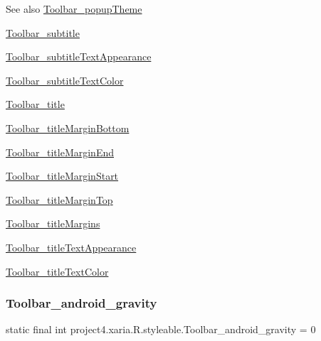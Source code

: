 \begin{DoxySeeAlso}{See also}
\hyperlink{classproject4_1_1xaria_1_1R_1_1styleable_ad04ed82b66818e311f872c158b0d6df5}{Toolbar\+\_\+popup\+Theme} 

\hyperlink{classproject4_1_1xaria_1_1R_1_1styleable_ab72a989ed660ee062ccf0405ae356a90}{Toolbar\+\_\+subtitle} 

\hyperlink{classproject4_1_1xaria_1_1R_1_1styleable_a4b938685d0218d8e307f8df758e2ca89}{Toolbar\+\_\+subtitle\+Text\+Appearance} 

\hyperlink{classproject4_1_1xaria_1_1R_1_1styleable_af2caead52c870ae8c1443c261585491e}{Toolbar\+\_\+subtitle\+Text\+Color} 

\hyperlink{classproject4_1_1xaria_1_1R_1_1styleable_abef8adccf5d6ad9f215787dab4631fcd}{Toolbar\+\_\+title} 

\hyperlink{classproject4_1_1xaria_1_1R_1_1styleable_a246fa138dbd3b691aa3595a8fb636a01}{Toolbar\+\_\+title\+Margin\+Bottom} 

\hyperlink{classproject4_1_1xaria_1_1R_1_1styleable_a5d2d546ae88e0aa378d02d8602e73b8a}{Toolbar\+\_\+title\+Margin\+End} 

\hyperlink{classproject4_1_1xaria_1_1R_1_1styleable_a96bcd70f7086d38b52652bee6e3f119a}{Toolbar\+\_\+title\+Margin\+Start} 

\hyperlink{classproject4_1_1xaria_1_1R_1_1styleable_aae9e96acb00fe36e1bac77812532a605}{Toolbar\+\_\+title\+Margin\+Top} 

\hyperlink{classproject4_1_1xaria_1_1R_1_1styleable_aad3d076117cb0923a57bf3c96cc0a6d5}{Toolbar\+\_\+title\+Margins} 

\hyperlink{classproject4_1_1xaria_1_1R_1_1styleable_ab0deb931fcb51a59a9c57d317339ad4d}{Toolbar\+\_\+title\+Text\+Appearance} 

\hyperlink{classproject4_1_1xaria_1_1R_1_1styleable_ae59bec88cab4e203af7c4a6242b338ed}{Toolbar\+\_\+title\+Text\+Color} 
\end{DoxySeeAlso}
\mbox{\label{classproject4_1_1xaria_1_1R_1_1styleable_aaa01afab589b8e590f5d025a28cf7404}} 
\subsubsection{\texorpdfstring{Toolbar\+\_\+android\+\_\+gravity}{Toolbar\_android\_gravity}}
{\footnotesize\ttfamily static final int project4.\+xaria.\+R.\+styleable.\+Toolbar\+\_\+android\+\_\+gravity = 0\hspace{0.3cm}{\ttfamily [static]}}


